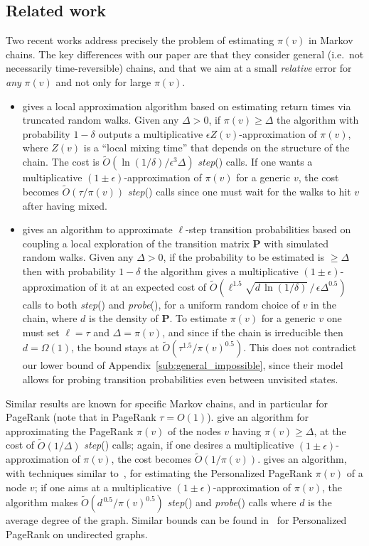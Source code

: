 \documentclass[a4paper,11pt]{article}
\newcommand{\bfP}{\mathbf{P}}
\newcommand{\step}{\textit{step}}
\newcommand{\probe}{\textit{probe}}
\begin{document}
\subsection{Related work}
\label{sub:rel}
Two recent works address precisely the problem of estimating $\pi(v)$ in Markov chains.
The key differences with our paper are that they consider general (i.e.\ not necessarily time-reversible) chains, and that we aim at a small \emph{relative} error for \emph{any} $\pi(v)$ and not only for large $\pi(v)$.
\begin{itemize}
\item \cite{Lee&2013} gives a local approximation algorithm based on estimating return times via truncated random walks.
Given any $\Delta > 0$, if $\pi(v) \ge \Delta$ the algorithm with probability $1-\delta$ outputs a multiplicative $\epsilon Z(v)$-approximation of $\pi(v)$, where $Z(v)$ is a ``local mixing time'' that depends on the structure of the chain.
The cost is $\tilde{O}(\ln{\!(1/\delta)} / \epsilon^3 \Delta)$ \step() calls.
If one wants a multiplicative $(1\pm\epsilon)$-approximation of $\pi(v)$ for a generic $v$, the cost becomes $\tilde{O}(\tau / \pi(v))$ \step() calls since one must wait for the walks to hit $v$ after having mixed.

\item \cite{Lofgren&2015b} gives an algorithm to approximate $\ell$-step transition probabilities based on coupling a local exploration of the transition matrix $\bfP$ with simulated random walks.
Given any $\Delta>0$, if the probability to be estimated is $\ge \Delta$ then with probability $1-\delta$ the algorithm gives a multiplicative $(1\pm\epsilon)$-approximation of it at an expected cost of $\tilde{O}(\ell^{1.5} \sqrt{d\, \ln{\!(1/\delta)}} \,/\, \epsilon \Delta^{0.5})$ calls to both \step() and \probe(), for a uniform random choice of $v$ in the chain, where $d$ is the density of $\bfP$.
To estimate $\pi(v)$ for a generic $v$ one must set $\ell = \tau$ and $\Delta = \pi(v)$, and since if the chain is irreducible then $d=\Omega(1)$, the bound stays at $\tilde{O}(\tau^{1.5} / \pi(v)^{0.5})$.
This does not contradict our lower bound of Appendix~\ref{sub:general_impossible}, since their model allows for probing transition probabilities even between unvisited states.
\end{itemize}

Similar results are known for specific Markov chains, and in particular for PageRank (note that in PageRank $\tau = O(1)$).
\cite{Borgs&2012,Borgs&2014} give an algorithm for approximating the PageRank $\pi(v)$ of the nodes $v$ having $\pi(v) \ge \Delta$, at the cost of $\tilde{O}(1/\Delta)$ \step() calls; again, if one desires a multiplicative $(1\pm\epsilon)$-approximation of $\pi(v)$, the cost becomes $\tilde{O}(1/\pi(v))$.
\cite{Lofgren&2014b} gives an algorithm, with techniques similar to~\cite{Lofgren&2015b}, for estimating the Personalized PageRank $\pi(v)$ of a node $v$; if one aims at a multiplicative $(1\pm\epsilon)$-approximation of $\pi(v)$, the algorithm makes $\tilde{O}(d^{\,0.5} / \pi(v)^{0.5})$ \step() and \probe() calls where $d$ is the average degree of the graph.
Similar bounds can be found in~\cite{Lofgren&2015} for Personalized PageRank on undirected graphs.
\end{document}
